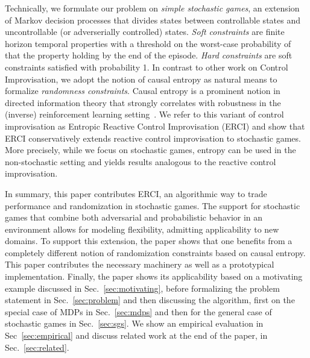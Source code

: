 Technically, we formulate our problem on \emph{simple stochastic
games}, an extension of Markov decision processes that divides states
between controllable states and uncontrollable (or adverserially
controlled) states. \emph{Soft constraints} are finite horizon
temporal properties with a threshold on the worst-case probability of
that the property holding by the end of the episode. \emph{Hard
constraints} are soft constraints satisfied with probability 1. In
contrast to other work on Control Improvisation, we adopt the notion
of causal entropy as natural means to formalize \emph{randomness
constraints}.  Causal entropy is a prominent notion in directed
information theory that strongly correlates with robustness in the
(inverse) reinforcement learning setting~\cite{mceThesis,
maxEntAnswer}. We refer to this variant of control improvisation as
Entropic Reactive Control Improvisation (ERCI) and show that ERCI
conservatively extends reactive control improvisation to stochastic
games. More precisely, while we focus on stochastic games, entropy can
be used in the non-stochastic setting and yields results analogous to
the reactive control improvisation.

%
In summary, this paper contributes ERCI, an algorithmic way to trade
performance and randomization in stochastic games. The support for
stochastic games that combine both adversarial and probabilistic
behavior in an environment allows for modeling flexibility,
admitting applicability to new domains. To support this extension,
the paper shows that one benefits from a completely different notion
of randomization constraints based on causal entropy.  This paper
contributes the necessary machinery as well as a prototypical
implementation. Finally, the paper shows its applicability based on a
motivating example discussed in Sec.~\ref{sec:motivating}, before
formalizing the problem statement in Sec.~\ref{sec:problem} and then
discussing the algorithm, first on the special case of MDPs in
Sec.~\ref{sec:mdps} and then for the general case of stochastic games
in Sec.~\ref{sec:sgs}.  We show an empirical evaluation in
Sec~\ref{sec:empirical} and discuss related work at the end of the
paper, in Sec.~\ref{sec:related}.

